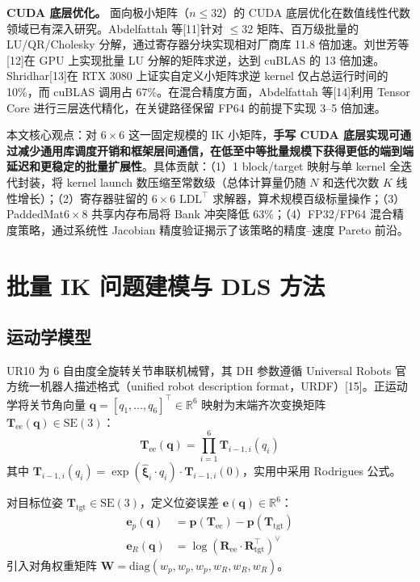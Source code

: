 \documentclass[twocolumn,a4paper,10pt]{ctexart}
\begin{document}
{\bfseries CUDA 底层优化。} 面向极小矩阵（$n\le32$）的 CUDA 底层优化在数值线性代数领域已有深入研究。Abdelfattah 等[11]针对 $\le32$ 矩阵、百万级批量的 LU/QR/Cholesky 分解，通过寄存器分块实现相对厂商库 11.8 倍加速。刘世芳等[12]在 GPU 上实现批量 LU 分解的矩阵求逆，达到 cuBLAS 的 13 倍加速。Shridhar[13]在 RTX 3080 上证实自定义小矩阵求逆 kernel 仅占总运行时间的 10\%，而 cuBLAS 调用占 67\%。在混合精度方面，Abdelfattah 等[14]利用 Tensor Core 进行三层迭代精化，在关键路径保留 FP64 的前提下实现 3--5 倍加速。

本文核心观点：对 $6\times6$ 这一固定规模的 IK 小矩阵，{\bfseries 手写 CUDA 底层实现可通过减少通用库调度开销和框架层间通信，在低至中等批量规模下获得更低的端到端延迟和更稳定的批量扩展性}。具体贡献：（1）1 block/target 映射与单 kernel 全迭代封装，将 kernel launch 数压缩至常数级（总体计算量仍随 $N$ 和迭代次数 $K$ 线性增长）；（2）寄存器驻留的 $6\times6$ $\mathrm{LDL}^\top$ 求解器，算术规模百级标量操作；（3）PaddedMat$6\times8$ 共享内存布局将 Bank 冲突降低 63\%；（4）FP32/FP64 混合精度策略，通过系统性 Jacobian 精度验证揭示了该策略的精度--速度 Pareto 前沿。

\section{批量 IK 问题建模与 DLS 方法}\label{sec:model}

\subsection{运动学模型}

UR10 为 6 自由度全旋转关节串联机械臂，其 DH 参数遵循 Universal Robots 官方统一机器人描述格式（unified robot description format，URDF）[15]。正运动学将关节角向量 $\mathbf{q}=[q_1,\ldots,q_6]^\top\in\mathbb{R}^6$ 映射为末端齐次变换矩阵 $\mathbf{T}_{\mathrm{ee}}(\mathbf{q})\in\mathrm{SE}(3)$：
\begin{equation}
\mathbf{T}_{\mathrm{ee}}(\mathbf{q}) = \prod_{i=1}^{6} \mathbf{T}_{i-1,i}(q_i)\label{eq:fk}
\end{equation}
其中 $\mathbf{T}_{i-1,i}(q_i)=\exp(\hat{\boldsymbol{\xi}}_i\cdot q_i)\cdot\mathbf{T}_{i-1,i}(0)$，实用中采用 Rodrigues 公式。

对目标位姿 $\mathbf{T}_{\mathrm{tgt}}\in\mathrm{SE}(3)$，定义位姿误差 $\mathbf{e}(\mathbf{q})\in\mathbb{R}^6$：
\begin{align}
\mathbf{e}_p(\mathbf{q}) &= \mathbf{p}(\mathbf{T}_{\mathrm{ee}}) - \mathbf{p}(\mathbf{T}_{\mathrm{tgt}})\label{eq:epos} \\
\mathbf{e}_R(\mathbf{q}) &= \log(\mathbf{R}_{\mathrm{ee}}\cdot\mathbf{R}_{\mathrm{tgt}}^\top)^\vee\label{eq:erot}
\end{align}
引入对角权重矩阵 $\mathbf{W}=\mathrm{diag}(w_p,w_p,w_p,w_R,w_R,w_R)$。
\end{document}
